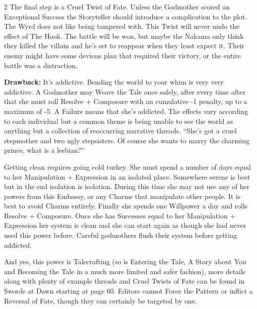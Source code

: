 \begin{multicols}{2}
The final step is a Cruel Twist of Fate. Unless the Godmother scored an Exceptional Success the Storyteller should introduce a complication to the plot. The Wyrd does not like being tampered with. This Twist will never undo the effect of The Hook. The battle will be won, but maybe the Nakama only think they killed the villain and he's set to reappear when they least expect it. Their enemy might have some devious plan that required their victory, or the entire battle was a distraction.

\textbf{Drawback:} It's addictive. Bending the world to your whim is very very addictive. A Godmother may Weave the Tale once safely, after every time after that she must roll Resolve + Composure with an cumulative -1 penalty, up to a maximum of -5. A Failure means that she's addicted. The effects vary according to each individual but a common theme is being unable to see the world as anything but a collection of reoccurring narrative threads. \textquotedblleft She's got a cruel stepmother and two ugly stepsisters. Of course she wants to marry the charming prince, what is a lesbian?\textquotedblright\,

Getting clean requires going cold turkey. She must spend a number of days equal to her Manipulation + Expression in an isolated place. Somewhere serene is best but in the end isolation is isolation. During this time she may not use any of her powers from this Embassy, or any Charms that manipulate other people. It is best to avoid Charms entirely. Finally she spends one Willpower a day and rolls Resolve + Composure. Once she has Successes equal to her Manipulation + Expression her system is clean and she can start again as though she had never used this power before. Careful godmothers flush their system before getting addicted.

And yes, this power is Talecrafting (so is Entering the Tale, A Story about You and Becoming the Tale in a much more limited and safer fashion), more details along with plenty of example threads and Cruel Twists of Fate can be found in Swords at Dawn starting at page 60. Editors cannot Force the Pattern or inflict a Reversal of Fate, though they can certainly be targeted by one. 

\end{multicols}